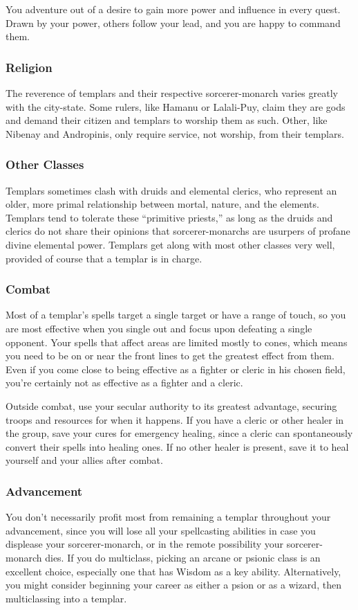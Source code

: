 You adventure out of a desire to gain more power and influence in every quest. Drawn by your power, others follow your lead, and you are happy to command them.

\subsubsection{Religion}
The reverence of templars and their respective sorcerer-monarch varies greatly with the city-state. Some rulers, like Hamanu or Lalali-Puy, claim they are gods and demand their citizen and templars to worship them as such. Other, like Nibenay and Andropinis, only require service, not worship, from their templars.

\subsubsection{Other Classes}
Templars sometimes clash with druids and elemental clerics, who represent an older, more primal relationship between mortal, nature, and the elements. Templars tend to tolerate these ``primitive priests,'' as long as the druids and clerics do not share their opinions that sorcerer-monarchs are usurpers of profane divine elemental power. Templars get along with most other classes very well, provided of course that a templar is in charge.

\subsubsection{Combat}
Most of a templar's spells target a single target or have a range of touch, so you are most effective when you single out and focus upon defeating a single opponent. Your spells that affect areas are limited mostly to cones,
which means you need to be on or near the front lines to get the greatest effect from them. Even if you come close to being effective as a fighter or cleric in his chosen field, you're certainly not as effective as a fighter and a cleric.

Outside combat, use your secular authority to its greatest advantage, securing troops and resources for when it happens. If you have a cleric or other healer in the group, save your cures for emergency healing, since a cleric can spontaneously convert their spells into healing ones. If no other healer is present, save it to heal yourself and your allies after combat.

\subsubsection{Advancement}
You don't necessarily profit most from remaining a templar throughout your advancement, since you will lose all your spellcasting abilities in case you displease your sorcerer-monarch, or in the remote possibility your sorcerer-monarch dies. If you do multiclass, picking an arcane or psionic class is an excellent choice, especially one that has Wisdom as a key ability. Alternatively, you might consider beginning your career as either a psion or as a wizard, then multiclassing into a templar.

